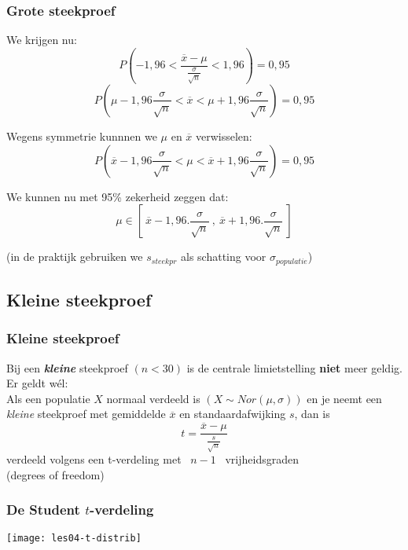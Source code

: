 \documentclass[aspectratio=169]{beamer}
\begin{document}
\begin{frame}
  \frametitle{Grote steekproef}
  
  We krijgen nu:
  \[ P\left(-1,96 < \frac{\overline{x} - \mu}{\frac{\sigma}{\sqrt{n}}} < 1,96 \right) = 0,95 \]
  \[ P\left( \mu-1,96 \frac{\sigma}{\sqrt{n}} < \overline{x} < \mu+1,96 \frac{\sigma}{\sqrt{n}} \right)  = 0,95 \]
  
  Wegens symmetrie kunnnen we $\mu$ en $\overline{x}$ verwisselen:
  \[ P\left( \overline{x}-1,96 \frac{\sigma}{\sqrt{n}} < \mu < \overline{x}+1,96 \frac{\sigma}{\sqrt{n}} \right)  = 0,95 \]
  
  We kunnen nu met 95\% zekerheid zeggen dat:
  \[ \mu \in \left[~\overline{x}-1,96.\frac{\sigma}{\sqrt{n}}~,~\overline{x}+1,96. \frac{\sigma}{\sqrt{n}}~\right] \]
  
  \small (in de praktijk gebruiken we $s_{steekpr}$ als schatting voor $\sigma_{populatie}$)
  
\end{frame}

\subsection{Kleine steekproef}
\begin{frame}
  \frametitle{Kleine steekproef}
  Bij een \textit{\textbf{kleine}} steekproef $(n < 30)$ is de centrale limietstelling \textbf{niet} meer geldig.
  \vfill
  Er geldt wél:\\
  \vfill
  Als een populatie $X$ normaal verdeeld is $(X \sim Nor(\mu,\sigma))$
  en je neemt een \textit{kleine} steekproef met gemiddelde $\overline{x}$ en standaardafwijking $s$,
  dan is
  \[ t = \frac{\overline{x} - \mu}{\frac{s}{\sqrt{n}}} \]
  verdeeld volgens een t-verdeling met ~$n-1$~ vrijheidsgraden\\
  (degrees of freedom)
  
\end{frame}

\begin{frame}
  \frametitle{De Student $t$-verdeling}
  \bigskip
  \centering
  \texttt{[image: les04-t-distrib]}
\end{frame}
\end{document}

